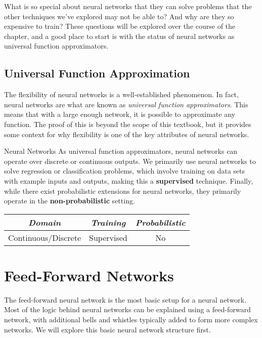 What is so special about neural networks that they can solve problems that the other techniques we've explored may not be able to? And why are they so expensive to train? These questions will be explored over the course of the chapter, and a good place to start is with the status of neural networks as universal function approximators.

\subsection{Universal Function Approximation}
The flexibility of neural networks is a well-established phenomenon. In fact, neural networks are what are known as \textit{universal function approximators}. This means that with a large enough network, it is possible to approximate any function. The proof of this is beyond the scope of this textbook, but it provides some context for why flexibility is one of the key attributes of neural networks.

\begin{mlcube}{Neural Networks}
As universal function approximators, neural networks can operate over discrete or continuous outputs. We primarily use neural networks to solve regression or classification problems, which involve training on data sets with example inputs and outputs, making this a \textbf{supervised} technique. Finally, while there exist probabilistic extensions for neural networks, they primarily operate in the \textbf{non-probabilistic} setting.
\begin{center}
    \begin{tabular}{c|c|c}
    \textit{\textbf{Domain}} & \textit{\textbf{Training}} & \textit{\textbf{Probabilistic}} \\
    \hline
    Continuous/Discrete & Supervised & No \\
    \end{tabular}
\end{center}
\end{mlcube}

\section{Feed-Forward Networks}
The feed-forward neural network is the most basic setup for a neural network. Most of the logic behind neural networks can be explained using a feed-forward network, with additional bells and whistles typically added to form more complex networks. We will explore this basic neural network structure first.


